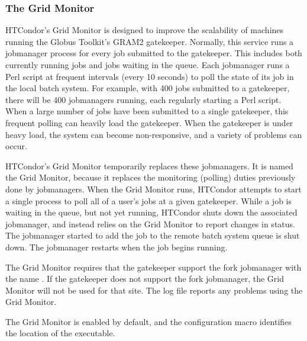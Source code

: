 \subsubsection{\label{sec:HTCondor-G-GridMonitor}The Grid Monitor}

HTCondor's Grid Monitor is designed to improve the scalability of
machines running the Globus Toolkit's GRAM2 gatekeeper.
Normally, this service runs a jobmanager process for 
every job submitted to the gatekeeper.
This includes both currently running jobs and jobs waiting in the queue.
Each jobmanager runs a Perl script at
frequent intervals (every 10 seconds) to poll the state of
its job in the local batch system.
For example, with 400 jobs submitted to a gatekeeper,
there will be 400 jobmanagers running,
each regularly starting a Perl script.
When a large number of jobs
have been submitted to a single gatekeeper,
this frequent polling can heavily load the gatekeeper.
When the gatekeeper is under heavy load,
the system can become non-responsive, and a variety of problems can occur.

HTCondor's Grid Monitor temporarily replaces these jobmanagers.
It is named the Grid Monitor, because it replaces the monitoring
(polling) duties previously done by jobmanagers.
When the Grid Monitor runs,
HTCondor attempts to start a single
process to poll all of a user's jobs at a given gatekeeper.
While a job is waiting in the queue, but not yet running,
HTCondor shuts down the associated jobmanager,
and instead relies on the Grid Monitor to report changes in status.
The jobmanager started to add the job to the remote
batch system queue is shut down.
The jobmanager restarts when the job begins running.

The Grid Monitor requires that the gatekeeper support the fork
jobmanager with the name .
If the gatekeeper does not support the fork jobmanager,
the Grid Monitor will not be used for that site.
The  log file reports any problems
using the Grid Monitor.

The Grid Monitor is enabled by default,
and the
configuration macro  identifies
the location of the executable.

